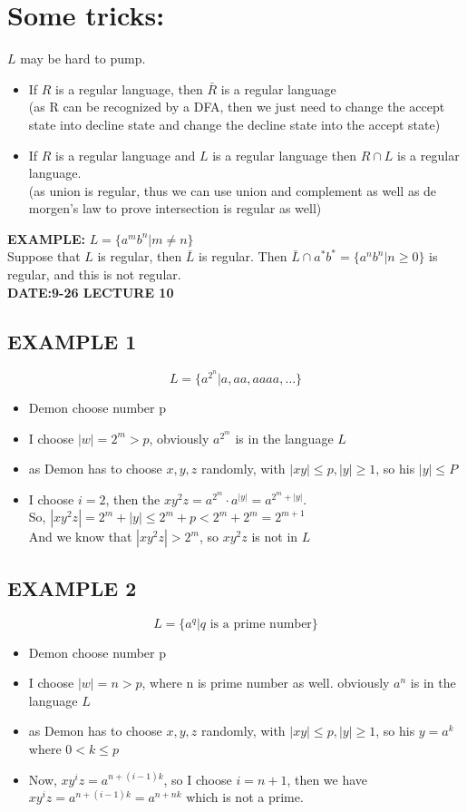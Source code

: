 \documentclass [9 pt]{article}
\theoremstyle{definition}
\begin{document}
\section*{Some tricks:}
$L$ may be hard to pump.\\ 
\begin{itemize}
	\item If $R$ is a regular language, then $\bar{R}$ is a regular language\\
	(as R can be recognized by a DFA, then we just need to change the accept state into decline state and change the decline state into the accept state)
	\item If $R$ is a regular language and $L$ is a regular language then $R\cap L$ is a regular language.\\
	(as union is regular, thus we can use union and complement as well as de morgen's law to prove intersection is regular as well)
\end{itemize}
\textbf{EXAMPLE:} $L = \{a^m b^n | m \neq n \}$\\
Suppose that $L$ is regular, then $\bar{L}$ is regular.
Then $\bar{L} \cap a^*b^* = \{a^n b^n |  n\geq 0 \} $ is regular, and this is not regular.\\
\newline
\newline
\textbf{DATE:9-26 LECTURE 10}
\subsection*{EXAMPLE 1}
$$L = \{ a^{2^{n}}|a, aa, aaaa, \ldots \}$$
\begin{itemize}
	\item Demon choose number p
	\item I choose $|w| = 2^m > p$, obviously $a^{2^m}$ is  in the language $L$
	\item as Demon has to choose $ x, y, z $ randomly, with $|x y| \leq p, |y| \geq 1 $, so his $|y| \leq P $ 
	\item I choose $i = 2$, then the $xy^2z = a^{2^m}\cdot a^{|y|} = a^{2^m + |y|}  $. \\
	So, $|xy^2z| = 2^m + |y| \leq  2^m + p < 2^m + 2^m = 2^{m + 1} $ \\
	And we know that $|xy^2z| > 2^m $, so $xy^2z$ is not in $L$
\end{itemize}

\subsection*{EXAMPLE 2}
$$L = \{ a^{q}|q \text{ is a prime number} \}$$
\begin{itemize}
	\item Demon choose number p
	\item I choose $|w| = n > p$, where n is prime number as well. obviously $a^{n}$ is  in the language $L$
	\item as Demon has to choose $ x, y, z $ randomly, with $|x y| \leq p, |y| \geq 1 $, so his $y = a^k $ where $0 < k \leq p $ 
	\item Now, $xy^iz = a^{n + (i-1)k}$, so I choose $i = n+1$, then we have $xy^iz = a^{n + (i-1)k} = a^{n + nk} $ which is not a prime.\\
\end{itemize}
\newpage
\end{document}
